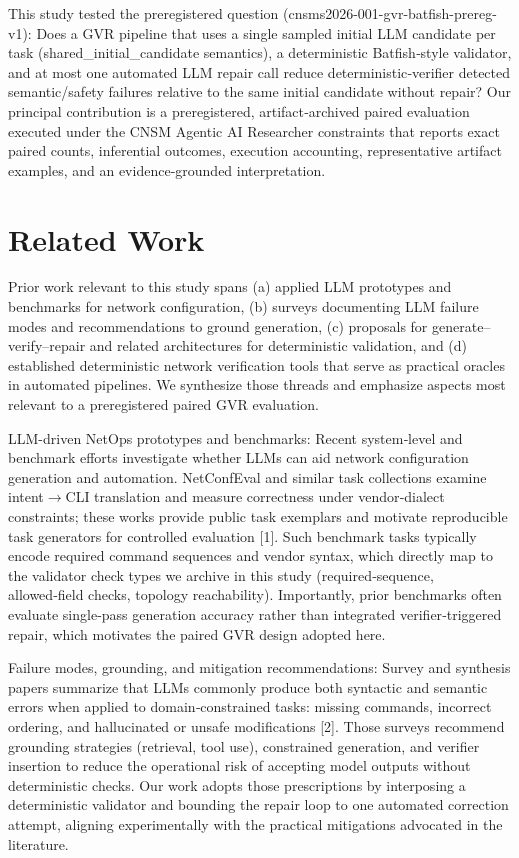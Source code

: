 \documentclass[conference]{IEEEtran}
\begin{document}
This study tested the preregistered question (cnsms2026-001-gvr-batfish-prereg-v1): Does a GVR pipeline that uses a single sampled initial LLM candidate per task (shared\_initial\_candidate semantics), a deterministic Batfish‑style validator, and at most one automated LLM repair call reduce deterministic‑verifier detected semantic/safety failures relative to the same initial candidate without repair? Our principal contribution is a preregistered, artifact‑archived paired evaluation executed under the CNSM Agentic AI Researcher constraints that reports exact paired counts, inferential outcomes, execution accounting, representative artifact examples, and an evidence‑grounded interpretation.

\section{Related Work}
Prior work relevant to this study spans (a) applied LLM prototypes and benchmarks for network configuration, (b) surveys documenting LLM failure modes and recommendations to ground generation, (c) proposals for generate--verify--repair and related architectures for deterministic validation, and (d) established deterministic network verification tools that serve as practical oracles in automated pipelines. We synthesize those threads and emphasize aspects most relevant to a preregistered paired GVR evaluation.

LLM-driven NetOps prototypes and benchmarks: Recent system‑level and benchmark efforts investigate whether LLMs can aid network configuration generation and automation. NetConfEval and similar task collections examine intent\ensuremath{\rightarrow}CLI translation and measure correctness under vendor‑dialect constraints; these works provide public task exemplars and motivate reproducible task generators for controlled evaluation [1]. Such benchmark tasks typically encode required command sequences and vendor syntax, which directly map to the validator check types we archive in this study (required‑sequence, allowed‑field checks, topology reachability). Importantly, prior benchmarks often evaluate single‑pass generation accuracy rather than integrated verifier‑triggered repair, which motivates the paired GVR design adopted here.

Failure modes, grounding, and mitigation recommendations: Survey and synthesis papers summarize that LLMs commonly produce both syntactic and semantic errors when applied to domain‑constrained tasks: missing commands, incorrect ordering, and hallucinated or unsafe modifications [2]. Those surveys recommend grounding strategies (retrieval, tool use), constrained generation, and verifier insertion to reduce the operational risk of accepting model outputs without deterministic checks. Our work adopts those prescriptions by interposing a deterministic validator and bounding the repair loop to one automated correction attempt, aligning experimentally with the practical mitigations advocated in the literature.
\end{document}
